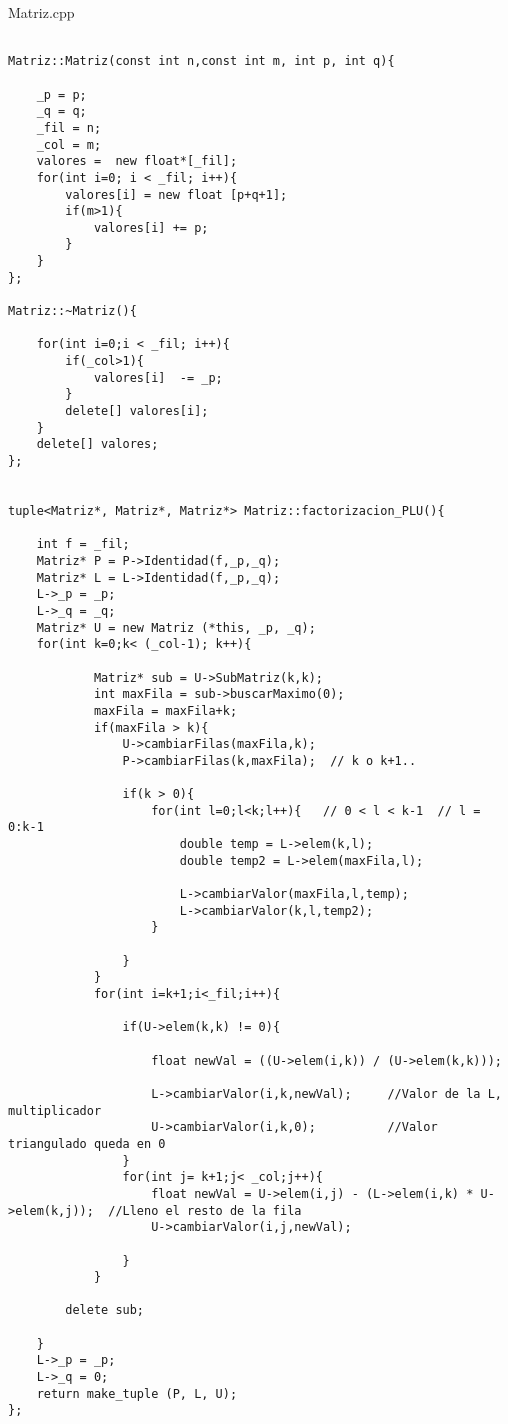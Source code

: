 {\Large Matriz.cpp}
\begin{lstlisting}

Matriz::Matriz(const int n,const int m, int p, int q){

	_p = p;
	_q = q;
	_fil = n;
	_col = m;
	valores =  new float*[_fil]; 
	for(int i=0; i < _fil; i++){
		valores[i] = new float [p+q+1]; 
		if(m>1){
			valores[i] += p;		
		}
	}
};

Matriz::~Matriz(){

	for(int i=0;i < _fil; i++){
		if(_col>1){
			valores[i]	-= _p;
		}
		delete[] valores[i];
	}
	delete[] valores;	
};


tuple<Matriz*, Matriz*, Matriz*> Matriz::factorizacion_PLU(){

    int f = _fil;
    Matriz* P = P->Identidad(f,_p,_q);
    Matriz* L = L->Identidad(f,_p,_q);
	L->_p = _p;
	L->_q = _q;
    Matriz* U = new Matriz (*this, _p, _q);
    for(int k=0;k< (_col-1); k++){

            Matriz* sub = U->SubMatriz(k,k);
            int maxFila = sub->buscarMaximo(0);
			maxFila = maxFila+k;
            if(maxFila > k){
                U->cambiarFilas(maxFila,k);
                P->cambiarFilas(k,maxFila);  // k o k+1..
				
                if(k > 0){
                    for(int l=0;l<k;l++){   // 0 < l < k-1  // l = 0:k-1
                        double temp = L->elem(k,l);
                        double temp2 = L->elem(maxFila,l);

                        L->cambiarValor(maxFila,l,temp);
                        L->cambiarValor(k,l,temp2);
                    }

                }
            }
            for(int i=k+1;i<_fil;i++){
	
                if(U->elem(k,k) != 0){

                    float newVal = ((U->elem(i,k)) / (U->elem(k,k)));
                    
                    L->cambiarValor(i,k,newVal);     //Valor de la L, multiplicador
                    U->cambiarValor(i,k,0);          //Valor triangulado queda en 0
                }
                for(int j= k+1;j< _col;j++){
                    float newVal = U->elem(i,j) - (L->elem(i,k) * U->elem(k,j));  //Lleno el resto de la fila
                    U->cambiarValor(i,j,newVal);

                }
            }
		
		delete sub;

    }
    L->_p = _p;
	L->_q = 0;	
    return make_tuple (P, L, U);
};
\end{lstlisting}